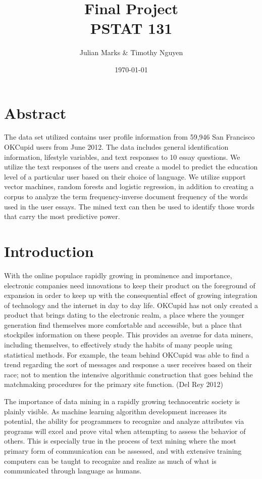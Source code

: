 \documentclass[a4paper,12pt]{article}
\begin{document}
\title{Final Project \\
\large{PSTAT 131}}
\author{Julian Marks & Timothy Nguyen}
\date{\today}
\maketitle

\section{Abstract}

The data set utilized contains user profile information from 59,946 San Francisco OKCupid users from June 2012. The data includes general identification information, lifestyle variables, and text responses to 10 essay questions. We utilize the text responses of the users and create a model to predict the education level of a particular user based on their choice of language. We utilize support vector machines, random forests and logistic regression, in addition to creating a corpus to analyze the term frequency-inverse document frequency of the words used in the user essays. The mined text can then be used to identify those words that carry the most predictive power.

\section{Introduction}

With the online populace rapidly growing in prominence and importance, electronic companies need innovations to keep their product on the foreground of expansion in order to keep up with the consequential effect of growing integration of technology and the internet in day to day life. OKCupid has not only created a product that brings dating to the electronic realm, a place where the younger generation find themselves more comfortable and accessible, but a place that stockpiles information on these people. This provides an avenue for data miners, including themselves, to effectively study the habits of many people using statistical methods. For example, the team behind OKCupid was able to find a trend regarding the sort of messages and response a user receives based on their race; not to mention the intensive algorithmic construction that goes behind the matchmaking procedures for the primary site function. (Del Rey 2012)

The importance of data mining in a rapidly growing technocentric society is plainly visible. As machine learning algorithm development increases its potential, the ability for programmers to recognize and analyze attributes via programs will excel and prove vital when attempting to assess the behavior of others. This is especially true in the process of text mining where the most primary form of communication can be assessed, and with extensive training computers can be taught to recognize and realize as much of what is communicated through language as humans.
\end{document}
